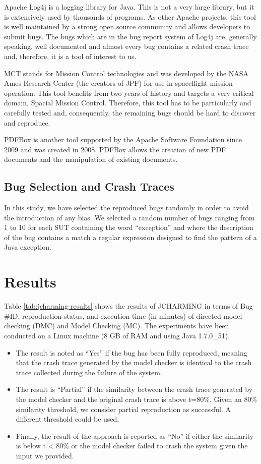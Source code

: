 \documentclass[times]{smrauth}
\begin{document}
Apache Log4j \cite{TheApacheSoftwareFoundation1999} is a logging library for Java. This is not a
very large library, but it is extensively used by thousands of
programs. As other Apache projects, this tool is well
maintained by a strong open source community and allows
developers to submit bugs. The bugs which are in the bug
report system of Log4j are, generally speaking, well
documented and almost every bug contains a related crash
trace and, therefore, it is a tool of interest to us.

MCT \cite{NASA2009} stands for Mission Control technologies and was
developed by the NASA Ames Research Center (the creators
of JPF) for use in spaceflight mission operation. This tool
benefits from two years of history and targets a very critical
domain, Spacial Mission Control. Therefore, this tool has to
be particularly and carefully tested and, consequently, the
remaining bugs should be hard to discover and reproduce.

PDFBox \cite{ApacheSoftwareFoundation2014} is another tool supported by the Apache
Software Foundation since 2009 and was created in 2008.
PDFBox allows the creation of new PDF documents and the
manipulation of existing documents.

\subsection{Bug Selection and Crash Traces}

In this study, we have selected the reproduced bugs randomly
in order to avoid the introduction of any bias. We selected a
random number of bugs ranging from 1 to 10 for each SUT
containing the word ``exception'' and where the description of
the bug contains a match a regular expression designed to find the pattern of a
Java exception.

\section{Results}

Table \ref{tab:jcharming-results} shows the results of JCHARMING in terms of Bug
\#ID, reproduction status, and execution time (in minutes) of
directed model checking (DMC) and Model Checking (MC).
The experiments have been conducted on a Linux machine (8
GB of RAM and using Java 1.7.0\_51).

\begin{itemize}
  \item The result is noted as ``Yes'' if the bug has been fully
reproduced, meaning that the crash trace generated by the
model checker is identical to the crash trace collected
during the failure of the system.
\item The result is ``Partial'' if the similarity between the crash
trace generated by the model checker and the original
crash trace is above t=80\%. Given an 80\% similarity
threshold, we consider partial reproduction as successful.
A different threshold could be used.
\item Finally, the result of the approach is reported as ``No'' if
either the similarity is below t < 80\% or the model
checker failed to crash the system given the input we
provided.
\end{itemize}
\end{document}
